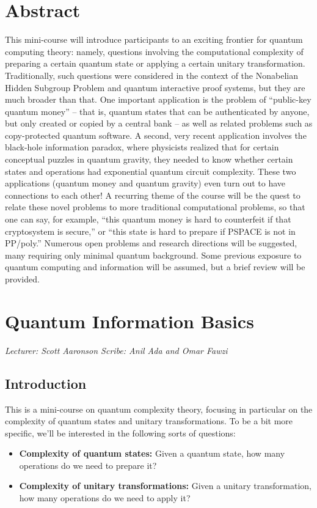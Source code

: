 \documentclass[12pt]{report}
\theoremstyle{plain}
\theoremstyle{definition}
\newcommand{\lecture}[3]{%
  \chapter{#3}%
  \vspace{-5ex}%
  \textit{Lecturer: #1 \hfill Scribe: #2}\par%
  \vspace{1ex}\titlerule\vspace{2ex}}
\begin{document}
\chapter*{Abstract}
This mini-course will introduce participants to an exciting frontier for quantum computing theory: namely, questions involving the computational complexity of preparing a certain quantum state or applying a certain unitary transformation. Traditionally, such questions were considered in the context of the Nonabelian Hidden Subgroup Problem and quantum interactive proof systems, but they are much broader than that. One important application is the problem of ``public-key quantum money'' -- that is, quantum states that can be authenticated by anyone, but only created or copied by a central bank -- as well as related problems such as copy-protected quantum software. A second, very recent application involves the black-hole information paradox, where physicists realized that for certain conceptual puzzles in quantum gravity, they needed to know whether certain states and operations had exponential quantum circuit complexity. These two applications (quantum money and quantum gravity) even turn out to have connections to each other! A recurring theme of the course will be the quest to relate these novel problems to more traditional computational problems, so that one can say, for example, ``this quantum money is hard to counterfeit if that cryptosystem is secure,'' or ``this state is hard to prepare if PSPACE is not in PP/poly.'' Numerous open problems and research directions will be suggested, many requiring only minimal quantum background. Some previous exposure to quantum computing and information will be assumed, but a brief review will be provided.

\lecture{Scott Aaronson}{Anil Ada and Omar Fawzi}{Quantum Information Basics}

\section{Introduction}

This is a mini-course on quantum complexity theory, focusing in particular on the complexity of quantum states and unitary transformations.
To be a bit more specific, we'll be interested in the following sorts of questions:
\begin{itemize}
    \item {\bf Complexity of quantum states:} Given a quantum state, how many operations do we need to prepare it?
    \item {\bf Complexity of unitary transformations:} Given a unitary transformation, how many operations do we need to apply it?
\end{itemize}
\end{document}
